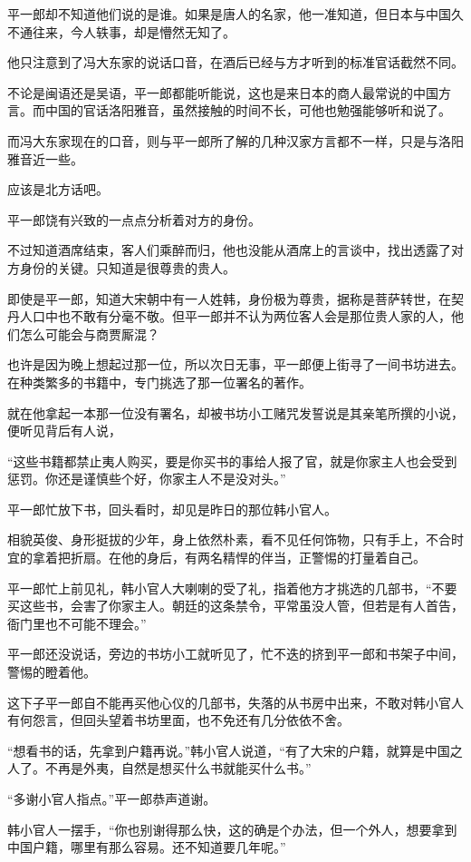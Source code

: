 平一郎却不知道他们说的是谁。如果是唐人的名家，他一准知道，但日本与中国久不通往来，今人轶事，却是懵然无知了。

他只注意到了冯大东家的说话口音，在酒后已经与方才听到的标准官话截然不同。

不论是闽语还是吴语，平一郎都能听能说，这也是来日本的商人最常说的中国方言。而中国的官话洛阳雅音，虽然接触的时间不长，可他也勉强能够听和说了。

而冯大东家现在的口音，则与平一郎所了解的几种汉家方言都不一样，只是与洛阳雅音近一些。

应该是北方话吧。

平一郎饶有兴致的一点点分析着对方的身份。

不过知道酒席结束，客人们乘醉而归，他也没能从酒席上的言谈中，找出透露了对方身份的关键。只知道是很尊贵的贵人。

即使是平一郎，知道大宋朝中有一人姓韩，身份极为尊贵，据称是菩萨转世，在契丹人口中也不敢有分毫不敬。但平一郎并不认为两位客人会是那位贵人家的人，他们怎么可能会与商贾厮混？

也许是因为晚上想起过那一位，所以次日无事，平一郎便上街寻了一间书坊进去。在种类繁多的书籍中，专门挑选了那一位署名的著作。

就在他拿起一本那一位没有署名，却被书坊小工赌咒发誓说是其亲笔所撰的小说，便听见背后有人说，

“这些书籍都禁止夷人购买，要是你买书的事给人报了官，就是你家主人也会受到惩罚。你还是谨慎些个好，你家主人不是没对头。”

平一郎忙放下书，回头看时，却见是昨日的那位韩小官人。

相貌英俊、身形挺拔的少年，身上依然朴素，看不见任何饰物，只有手上，不合时宜的拿着把折扇。在他的身后，有两名精悍的伴当，正警惕的打量着自己。

平一郎忙上前见礼，韩小官人大喇喇的受了礼，指着他方才挑选的几部书，“不要买这些书，会害了你家主人。朝廷的这条禁令，平常虽没人管，但若是有人首告，衙门里也不可能不理会。”

平一郎还没说话，旁边的书坊小工就听见了，忙不迭的挤到平一郎和书架子中间，警惕的瞪着他。

这下子平一郎自不能再买他心仪的几部书，失落的从书房中出来，不敢对韩小官人有何怨言，但回头望着书坊里面，也不免还有几分依依不舍。

“想看书的话，先拿到户籍再说。”韩小官人说道，“有了大宋的户籍，就算是中国之人了。不再是外夷，自然是想买什么书就能买什么书。”

“多谢小官人指点。”平一郎恭声道谢。

韩小官人一摆手，“你也别谢得那么快，这的确是个办法，但一个外人，想要拿到中国户籍，哪里有那么容易。还不知道要几年呢。”

